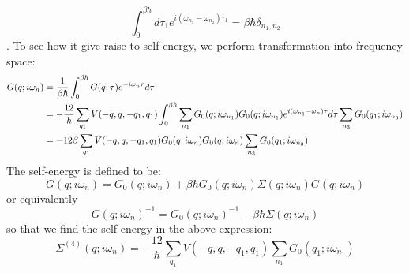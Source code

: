 \documentclass{article}
\begin{document}
\begin{equation}
    \int_0^{\beta\hbar} d\tau_1 e^{i(\omega_{n_1}-\omega_{n_2})\tau_1} = \beta\hbar \delta_{n_1,n_2}
\end{equation}.
To see how it give raise to self-energy, we perform transformation into frequency space:
\begin{align}
    G(q;i\omega_n) &= \frac{1}{\beta\hbar} \int_{0}^{\beta\hbar} G(q;\tau) e^{-i\omega_n\tau} d\tau \notag \\
        &= -\frac{12}{\hbar}\sum_{q_1} V(-q,q,-q_1,q_1) 
        \int_{0}^{\beta\hbar} \sum_{n_1} G_0(q;i\omega_{n_1}) G_0(q;i\omega_{n_1}) e^{i(\omega_{n_1}-\omega_n)\tau}  d\tau
        \sum_{n_3}G_0(q_1;i\omega_{n_3})  \notag \\
        &= -12\beta \sum_{q_1} V(-q,q,-q_1,q_1) G_0(q;i\omega_{n}) G_0(q;i\omega_{n})
        \sum_{n_3}G_0(q_1;i\omega_{n_3}) 
\end{align}
The self-energy is defined to be:
\begin{equation}
    G(q;i\omega_n) = G_0(q;i\omega_n) + \beta\hbar G_0(q;i\omega_n) \Sigma(q;i\omega_n) G(q;i\omega_n)
\end{equation}
or equivalently
\begin{equation}
    G(q;i\omega_n)^{-1} = G_0(q;i\omega_n)^{-1} - \beta\hbar \Sigma(q;i\omega_n) 
\end{equation}
so that we find the self-energy in the above expression:
\begin{equation}
    \Sigma^{(4)}(q;i\omega_n) = -\frac{12}{\hbar} \sum_{q_1} V(-q,q,-q_1,q_1) \sum_{n_1}G_0(q_1;i\omega_{n_1}) 
\end{equation}
\end{document}
